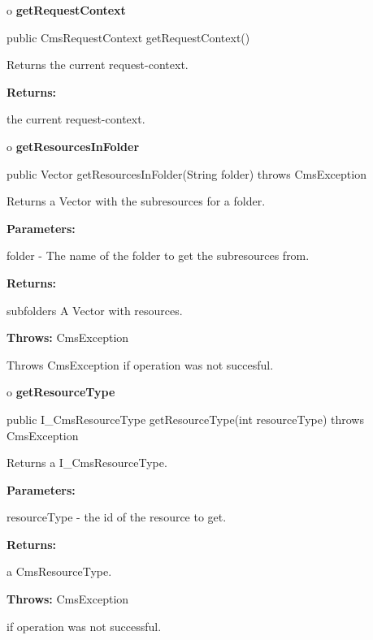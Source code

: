 o {\bf getRequestContext}

\begin{PRE}
 public CmsRequestContext getRequestContext()
\end{PRE}

\begin{description}
\htmlDD Returns the current request-context.

\begin{description}
\item {\bf Returns:}

the current request-context.
\end{description}

\end{description}

o {\bf getResourcesInFolder}

\begin{PRE}
 public Vector getResourcesInFolder(String folder) throws CmsException
\end{PRE}

\begin{description}
\htmlDD Returns a Vector with the subresources for a folder.\htmlBR

\begin{description}
\item {\bf Parameters:}

folder - The name of the folder to get the subresources from.
\item {\bf Returns:}

subfolders A Vector with resources.
\item {\bf Throws:} CmsException

Throws CmsException if operation was not succesful.
\end{description}

\end{description}

o {\bf getResourceType}

\begin{PRE}
 public I\_CmsResourceType getResourceType(int resourceType) throws CmsException
\end{PRE}

\begin{description}
\htmlDD Returns a I\_CmsResourceType.

\begin{description}
\item {\bf Parameters:}

resourceType - the id of the resource to get.
\item {\bf Returns:}

a CmsResourceType.
\item {\bf Throws:} CmsException

if operation was not successful.
\end{description}

\end{description}


